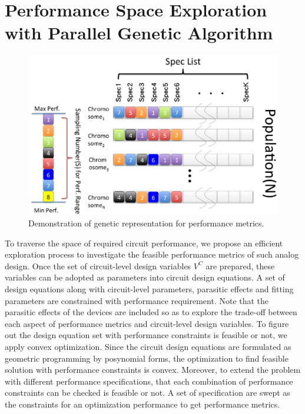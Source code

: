 
  \section{Performance Space Exploration with Parallel Genetic Algorithm}\label{sec:pga}
    
    \begin{figure}[t]
      \centering
      \includegraphics[width=\textwidth]{Fig/Gene.eps}
      \caption{Demonstration of genetic representation for performance metrics.} 
      \label{fig:Gene}
    \end{figure}

    To traverse the space of required circuit performance, we propose an efficient exploration process to investigate the feasible performance metrics of such analog design. Once the set of circuit-level design variables $V^C$ are prepared, these variables can be adopted as parameters into circuit design equations. A set of design equations along with circuit-level parameters, parasitic effects and fitting parameters are constrained with performance requirement. Note that the parasitic effects of the devices are included so as to explore the trade-off between each aspect of performance metrics and circuit-level design variables. To figure out the design equation set with performance constraints is feasible or not, we apply convex optimization. Since the circuit design equations are formulated as geometric programming by posynomial forms, the optimization to find feasible solution with performance constraints is convex. Moreover, to extend the problem with different performance specifications, that each combination of performance constraints can be checked is feasible or not. A set of specification are swept as the constraints for an optimization performance to get performance metrics.
 

